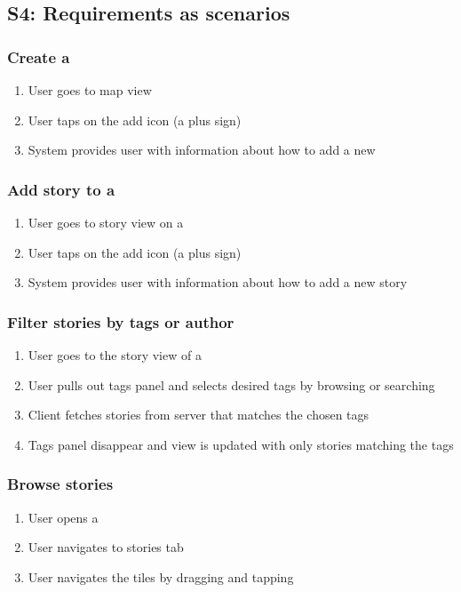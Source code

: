 \documentclass[11pt]{book}
\begin{document}
\subsection{S4: Requirements as scenarios}
\subsubsection{Create a \wallentitys}
\begin{enumerate}
\item User goes to map view
\item User taps on the add icon (a plus sign)
\item System provides user with information about how to add a new \wallentitys
\end{enumerate}

\subsubsection{Add story to a \wallentitys}
\begin{enumerate}
\item User goes to story view on a \wallentitys
\item User taps on the add icon (a plus sign)
\item System provides user with information about how to add a new story
\end{enumerate}

\subsubsection{Filter stories by tags or author}
\begin{enumerate}
\item User goes to the story view of a \wallentitys
\item User pulls out tags panel and selects desired tags by browsing or searching
\item Client fetches stories from server that matches the chosen tags
\item Tags panel disappear and \wallentitys view is updated with only stories matching the tags
\end{enumerate}

\subsubsection{Browse stories}
\begin{enumerate}
\item User opens a \wallentitys
\item User navigates to stories tab
\item User navigates the tiles by dragging and tapping
\end{enumerate}
\end{document}
